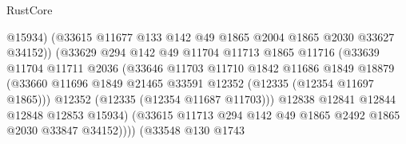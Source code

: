 \begin{lexlean}{RustCore}
\begin{coremodule}
                                    @15934)
                                  (@33615
                                    @11677
                                    @133
                                    @142
                                    @49
                                    @1865
                                    @2004
                                    @1865
                                    @2030
                                    @33627
                                    @34152))
                                (@33629
                                  @294
                                  @142
                                  @49
                                  @11704
                                  @11713
                                  @1865
                                  @11716
                                  (@33639
                                    @11704
                                    @11711
                                    @2036
                                    (@33646
                                      @11703
                                      @11710
                                      @1842
                                      @11686
                                      @1849
                                      @18879
                                      (@33660
                                        @11696
                                        @1849
                                        @21465
                                        @33591
                                        @12352
                                        (@12335 (@12354 @11697 @1865)))
                                      @12352
                                      (@12335 (@12354 @11687 @11703)))
                                    @12838
                                    @12841
                                    @12844
                                    @12848
                                    @12853
                                    @15934)
                                  (@33615
                                    @11713
                                    @294
                                    @142
                                    @49
                                    @1865
                                    @2492
                                    @1865
                                    @2030
                                    @33847
                                    @34152))))
                            (@33548
                              @130
                              @1743

\end{coremodule}
\end{lexlean}
